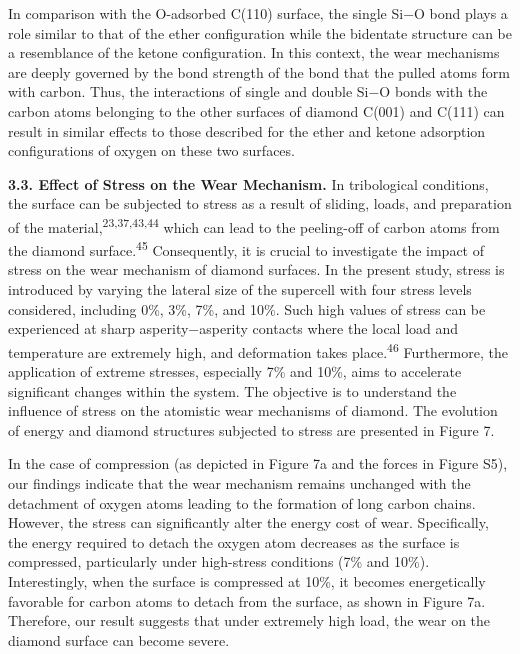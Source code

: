 \documentclass{article}
\begin{document}
In comparison with the O-adsorbed C(110) surface, the single Si−O bond plays a role similar to that of the ether configuration while the bidentate structure can be a resemblance of the ketone configuration. In this context, the wear mechanisms are deeply governed by the bond strength of the bond that the pulled atoms form with carbon. Thus, the interactions of single and double Si−O bonds with the carbon atoms belonging to the other surfaces of diamond C(001) and C(111) can result in similar effects to those described for the ether and ketone adsorption configurations of oxygen on these two surfaces.

\noindent\textbf{3.3. Effect of Stress on the Wear Mechanism.} In tribological conditions, the surface can be subjected to stress as a result of sliding, loads, and preparation of the material,\textsuperscript{23,37,43,44} which can lead to the peeling-off of carbon atoms from the diamond surface.\textsuperscript{45} Consequently, it is crucial to investigate the impact of stress on the wear mechanism of diamond surfaces. In the present study, stress is introduced by varying the lateral size of the supercell with four stress levels considered, including 0\%, 3\%, 7\%, and 10\%. Such high values of stress can be experienced at sharp asperity−asperity contacts where the local load and temperature are extremely high, and deformation takes place.\textsuperscript{46} Furthermore, the application of extreme stresses, especially 7\% and 10\%, aims to accelerate significant changes within the system. The objective is to understand the influence of stress on the atomistic wear mechanisms of diamond. The evolution of energy and diamond structures subjected to stress are presented in Figure 7.

In the case of compression (as depicted in Figure 7a and the forces in Figure S5), our findings indicate that the wear mechanism remains unchanged with the detachment of oxygen atoms leading to the formation of long carbon chains. However, the stress can significantly alter the energy cost of wear. Specifically, the energy required to detach the oxygen atom decreases as the surface is compressed, particularly under high-stress conditions (7\% and 10\%). Interestingly, when the surface is compressed at 10\%, it becomes energetically favorable for carbon atoms to detach from the surface, as shown in Figure 7a. Therefore, our result suggests that under extremely high load, the wear on the diamond surface can become severe.
\end{document}
